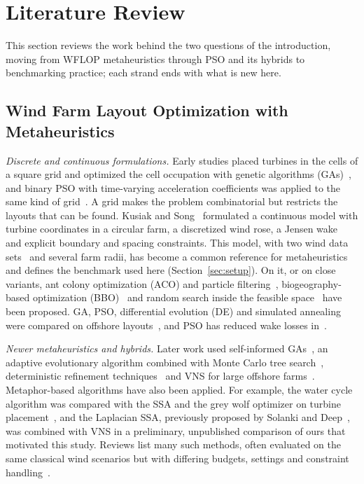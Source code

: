 \section{Literature Review}
\label{sec:related}
This section reviews the work behind the two questions of the introduction, moving from WFLOP metaheuristics through PSO and its hybrids to benchmarking practice; each strand ends with what is new here.

\subsection{Wind Farm Layout Optimization with Metaheuristics}
\label{sec:related-wflop}
\emph{Discrete and continuous formulations.} Early studies placed turbines in the cells of a square grid and optimized the cell occupation with genetic algorithms (GAs)~\cite{Mosetti1994,Grady2005}, and binary PSO with time-varying acceleration coefficients was applied to the same kind of grid~\cite{Pookpunt2013}. A grid makes the problem combinatorial but restricts the layouts that can be found. Kusiak and Song~\cite{Kusiak2010} formulated a continuous model with turbine coordinates in a circular farm, a discretized wind rose, a Jensen wake~\cite{Jensen1983,Katic1986} and explicit boundary and spacing constraints. This model, with two wind data sets~\cite{Kusiak2010,Bansal2017} and several farm radii, has become a common reference for metaheuristics and defines the benchmark used here (Section~\ref{sec:setup}). On it, or on close variants, ant colony optimization (ACO) and particle filtering~\cite{Eroglu2012,Eroglu2013}, biogeography-based optimization (BBO)~\cite{Bansal2017} and random search inside the feasible space~\cite{Feng2015} have been proposed. GA, PSO, differential evolution (DE) and simulated annealing were compared on offshore layouts~\cite{Elkinton2008}, and PSO has reduced wake losses in~\cite{Asaah2021}.

\emph{Newer metaheuristics and hybrids.} Later work used self-informed GAs~\cite{Ju2019}, an adaptive evolutionary algorithm combined with Monte Carlo tree search~\cite{Bai2022}, deterministic refinement techniques~\cite{Nagpal2021} and VNS for large offshore farms~\cite{Cazzaro2022}. Metaphor-based algorithms have also been applied. For example, the water cycle algorithm was compared with the SSA and the grey wolf optimizer on turbine placement~\cite{Rezk2019}, and the Laplacian SSA, previously proposed by Solanki and Deep~\cite{Solanki2023}, was combined with VNS in a preliminary, unpublished comparison of ours that motivated this study. Reviews list many such methods, often evaluated on the same classical wind scenarios but with differing budgets, settings and constraint handling~\cite{Azlan2021}.

